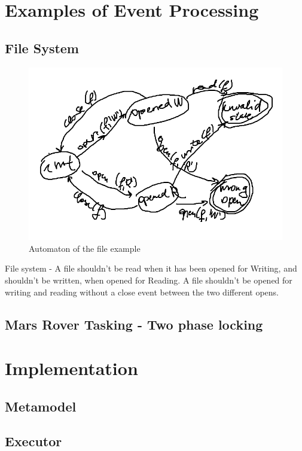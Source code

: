 \section{Examples of Event Processing}

	\subsection{File System}
	
	\begin{figure}[h]
	\centering
	\includegraphics[width=0.5\linewidth]{include/figures/chapter_5/fileautomaton}
	\caption{Automaton of the file example}
	\label{fig:cep:fileautomaton}
	\end{figure}

	File system - A file shouldn't be read when it has been opened for Writing, and shouldn't be written, when opened for Reading. 
	A file shouldn't be opened for writing and reading without a close event between the two different opens.
	
	
	\subsection{Mars Rover Tasking - Two phase locking}

\section{Implementation}
	\subsection{Metamodel}
	\subsection{Executor}
